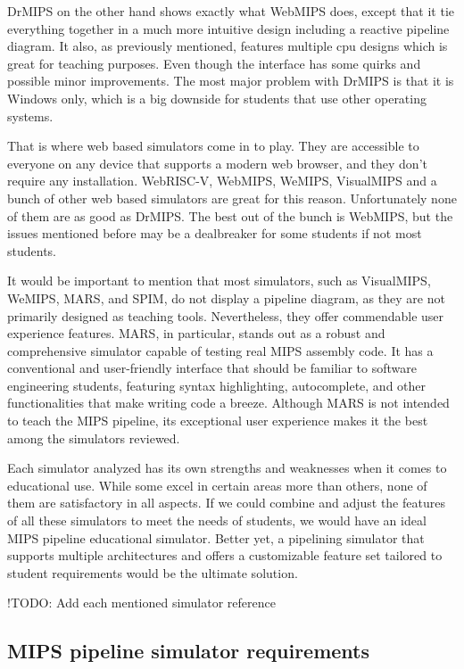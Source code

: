 DrMIPS on the other hand shows exactly what WebMIPS does, except that it tie everything together in a much more intuitive design including a reactive pipeline diagram. It also, as previously mentioned, features multiple cpu designs which is great for teaching purposes. Even though the interface has some quirks and possible minor improvements. The most major problem with DrMIPS is that it is Windows only, which is a big downside for students that use other operating systems.

That is where web based simulators come in to play. They are accessible to everyone on any device that supports a modern web browser, and they don't require any installation. WebRISC-V, WebMIPS, WeMIPS, VisualMIPS and a bunch of other web based simulators are great for this reason. Unfortunately none of them are as good as DrMIPS. The best out of the bunch is WebMIPS, but the issues mentioned before may be a dealbreaker for some students if not most students.

It would be important to mention that most simulators, such as VisualMIPS, WeMIPS, MARS, and SPIM, do not display a pipeline diagram, as they are not primarily designed as teaching tools. Nevertheless, they offer commendable user experience features. MARS, in particular, stands out as a robust and comprehensive simulator capable of testing real MIPS assembly code. It has a conventional and user-friendly interface that should be familiar to software engineering students, featuring syntax highlighting, autocomplete, and other functionalities that make writing code a breeze. Although MARS is not intended to teach the MIPS pipeline, its exceptional user experience makes it the best among the simulators reviewed.

Each simulator analyzed has its own strengths and weaknesses when it comes to educational use. While some excel in certain areas more than others, none of them are satisfactory in all aspects. If we could combine and adjust the features of all these simulators to meet the needs of students, we would have an ideal MIPS pipeline educational simulator. Better yet, a pipelining simulator that supports multiple architectures and offers a customizable feature set tailored to student requirements would be the ultimate solution.

!TODO: Add each mentioned simulator reference

\subsection{MIPS pipeline simulator requirements}\label{sec:mips_pipeline_simulator_requirements}

